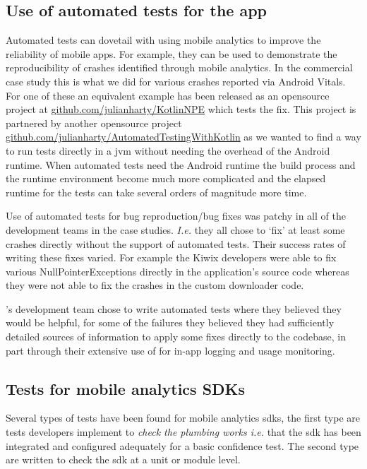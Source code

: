 \subsection{Use of automated tests for the app}
Automated tests can dovetail with using mobile analytics to improve the reliability of mobile apps. For example, they can be used to demonstrate the reproducibility of crashes identified through mobile analytics. In the commercial case study this is what we did for various crashes reported via Android Vitals. For one of these an equivalent example has been released as an opensource project at \href{https://github.com/julianharty/KotlinNPE}{github.com/julianharty/KotlinNPE} which tests the fix. This project is partnered by another opensource project \href{https://github.com/julianharty/AutomatedTestingWithKotlin}{github.com/julianharty/AutomatedTestingWithKotlin} as we wanted to find a way to run tests directly in a \gls{jvm} without needing the overhead of the Android runtime. When automated tests need the Android runtime the build process and the runtime environment become much more complicated and the elapsed runtime for the tests can take several orders of magnitude more time.

Use of automated tests for bug reproduction/bug fixes was patchy in all of the development teams in the case studies. \emph{I.e.} they all chose to `fix' at least some crashes directly without the support of automated tests. Their success rates of writing these fixes varied. For example the Kiwix developers were able to fix various NullPointerExceptions directly in the application's source code whereas they were not able to fix the crashes in the custom downloader code. 

's development team chose to write automated tests where they believed they would be helpful, for some of the failures they believed they had sufficiently detailed sources of information to apply some fixes directly to the codebase, in part through their extensive use of  for in-app logging and usage monitoring.



\subsection{Tests for mobile analytics SDKs}
Several types of tests have been found for mobile analytics \Gls{sdk}s, the first type are tests developers implement to \textit{check the plumbing works i.e.} that the \Gls{sdk} has been integrated and configured adequately for a basic confidence test. The second type are written to check the \Gls{sdk} at a unit or module level.

